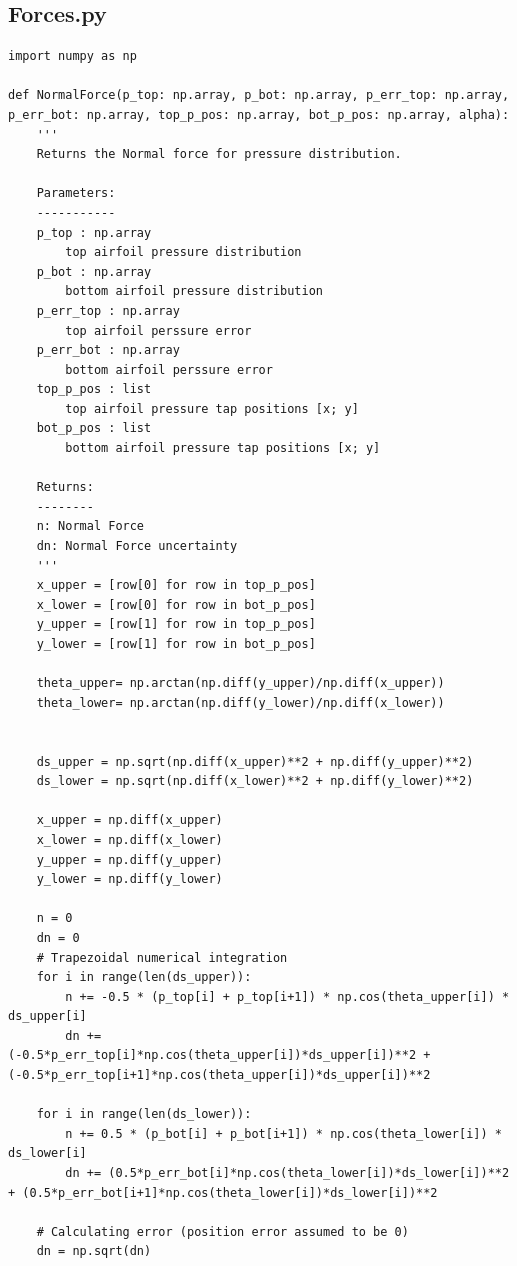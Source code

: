 \documentclass[11pt, letterpaper]{article}
\begin{document}
\begin{appendices}
\subsection{Forces.py}
\begin{verbatim}
import numpy as np

def NormalForce(p_top: np.array, p_bot: np.array, p_err_top: np.array, p_err_bot: np.array, top_p_pos: np.array, bot_p_pos: np.array, alpha):
    '''
    Returns the Normal force for pressure distribution.

    Parameters:
    -----------   
    p_top : np.array
        top airfoil pressure distribution
    p_bot : np.array
        bottom airfoil pressure distribution
    p_err_top : np.array
        top airfoil perssure error
    p_err_bot : np.array
        bottom airfoil perssure error
    top_p_pos : list
        top airfoil pressure tap positions [x; y]
    bot_p_pos : list
        bottom airfoil pressure tap positions [x; y]

    Returns:
    --------
    n: Normal Force
    dn: Normal Force uncertainty
    '''
    x_upper = [row[0] for row in top_p_pos]
    x_lower = [row[0] for row in bot_p_pos]
    y_upper = [row[1] for row in top_p_pos]
    y_lower = [row[1] for row in bot_p_pos]

    theta_upper= np.arctan(np.diff(y_upper)/np.diff(x_upper))
    theta_lower= np.arctan(np.diff(y_lower)/np.diff(x_lower))


    ds_upper = np.sqrt(np.diff(x_upper)**2 + np.diff(y_upper)**2)
    ds_lower = np.sqrt(np.diff(x_lower)**2 + np.diff(y_lower)**2)

    x_upper = np.diff(x_upper)
    x_lower = np.diff(x_lower)
    y_upper = np.diff(y_upper)
    y_lower = np.diff(y_lower)
    
    n = 0
    dn = 0
    # Trapezoidal numerical integration
    for i in range(len(ds_upper)):
        n += -0.5 * (p_top[i] + p_top[i+1]) * np.cos(theta_upper[i]) * ds_upper[i]
        dn += (-0.5*p_err_top[i]*np.cos(theta_upper[i])*ds_upper[i])**2 + (-0.5*p_err_top[i+1]*np.cos(theta_upper[i])*ds_upper[i])**2
    
    for i in range(len(ds_lower)):
        n += 0.5 * (p_bot[i] + p_bot[i+1]) * np.cos(theta_lower[i]) * ds_lower[i]
        dn += (0.5*p_err_bot[i]*np.cos(theta_lower[i])*ds_lower[i])**2 + (0.5*p_err_bot[i+1]*np.cos(theta_lower[i])*ds_lower[i])**2
    
    # Calculating error (position error assumed to be 0)
    dn = np.sqrt(dn)
    

\end{verbatim}
\end{appendices}
\end{document}
